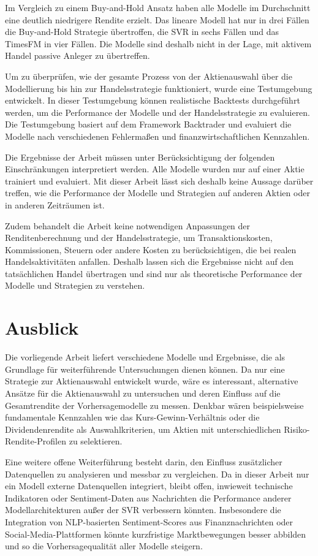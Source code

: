 Im Vergleich zu einem Buy-and-Hold Ansatz haben alle Modelle im Durchschnitt eine deutlich niedrigere Rendite erzielt. Das lineare Modell hat nur in drei Fällen die Buy-and-Hold Strategie übertroffen, die SVR in sechs Fällen und das TimesFM in vier Fällen. Die Modelle sind deshalb nicht in der Lage, mit aktivem Handel passive Anleger zu übertreffen.

Um zu überprüfen, wie der gesamte Prozess von der Aktienauswahl über die Modellierung bis hin zur Handelsstrategie funktioniert, wurde eine Testumgebung entwickelt. In dieser Testumgebung können realistische Backtests durchgeführt werden, um die Performance der Modelle und der Handelsstrategie zu evaluieren. Die Testumgebung basiert auf dem Framework Backtrader und evaluiert die Modelle nach verschiedenen Fehlermaßen und finanzwirtschaftlichen Kennzahlen.

Die Ergebnisse der Arbeit müssen unter Berücksichtigung der folgenden Einschränkungen interpretiert werden. Alle Modelle wurden nur auf einer Aktie trainiert und evaluiert. Mit dieser Arbeit lässt sich deshalb keine Aussage darüber treffen, wie die Performance der Modelle und Strategien auf anderen Aktien oder in anderen Zeiträumen ist.

Zudem behandelt die Arbeit keine notwendigen Anpassungen der Renditenberechnung und der Handelsstrategie, um Transaktionskosten, Kommissionen, Steuern oder andere Kosten zu berücksichtigen, die bei realen Handelsaktivitäten anfallen. Deshalb lassen sich die Ergebnisse nicht auf den tatsächlichen Handel übertragen und sind nur als theoretische Performance der Modelle und Strategien zu verstehen.


\chapter{Ausblick}
Die vorliegende Arbeit liefert verschiedene Modelle und Ergebnisse, die als Grundlage für weiterführende Untersuchungen dienen können. Da nur eine Strategie zur Aktienauswahl entwickelt wurde, wäre es interessant, alternative Ansätze für die Aktienauswahl zu untersuchen und deren Einfluss auf die Gesamtrendite der Vorhersagemodelle zu messen. Denkbar wären beispielsweise fundamentale Kennzahlen wie das Kurs-Gewinn-Verhältnis oder die Dividendenrendite als Auswahlkriterien, um Aktien mit unterschiedlichen Risiko-Rendite-Profilen zu selektieren.

Eine weitere offene Weiterführung besteht darin, den Einfluss zusätzlicher Datenquellen zu analysieren und messbar zu vergleichen. Da in dieser Arbeit nur ein Modell externe Datenquellen integriert, bleibt offen, inwieweit technische Indikatoren oder Sentiment-Daten aus Nachrichten die Performance anderer Modellarchitekturen außer der SVR verbessern könnten. Insbesondere die Integration von NLP-basierten Sentiment-Scores aus Finanznachrichten oder Social-Media-Plattformen könnte kurzfristige Marktbewegungen besser abbilden und so die Vorhersagequalität aller Modelle steigern.

